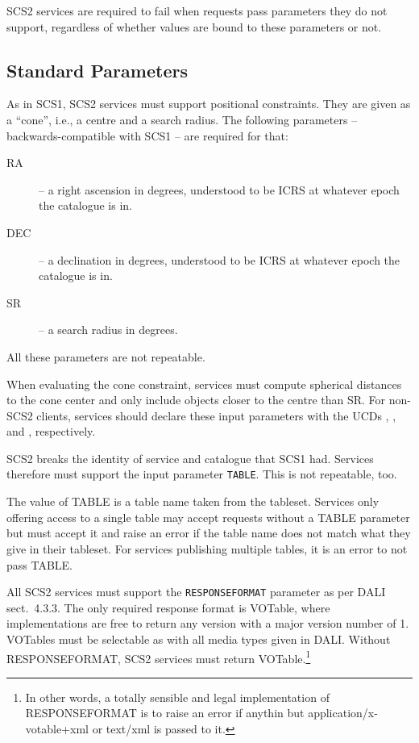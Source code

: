 \documentclass[11pt,a4paper]{ivoa}
\begin{document}
\begin{bigdescription}
SCS2 services are required to fail when requests pass parameters they do
not support, regardless of whether values are bound to these parameters
or not.

\subsection{Standard Parameters}

As in SCS1, SCS2 services must support positional constraints.  They are
given as a ``cone'', i.e., a centre and a search radius.  The following
parameters -- backwards-compatible with SCS1 -- are required for that:

\begin{description}
\item[RA] -- a right ascension in degrees, understood to be ICRS at
whatever epoch the catalogue is in.
\item[DEC] -- a declination in degrees, understood to be ICRS at
whatever epoch the catalogue is in.
\item[SR] -- a search radius in degrees.
\end{description}

All these parameters are not repeatable.

When evaluating the cone constraint, services must compute spherical
distances to the cone center and only include objects closer to the
centre than SR.  For non-SCS2 clients, services should declare these
input parameters with the UCDs , , and
, respectively.

SCS2 breaks the identity of service and catalogue that SCS1 had.
Services therefore must support the input parameter \verb|TABLE|.  This
is not repeatable, too.

The value of TABLE is a table name taken from the tableset.  Services
only offering access to a single table may accept requests without a
TABLE parameter but must accept it and raise an error if the table name
does not match what they give in their tableset.  For services
publishing multiple tables, it is an error to not pass TABLE.

All SCS2 services must support the \verb|RESPONSEFORMAT| parameter as
per DALI sect.~4.3.3.  The only required response format is VOTable,
where implementations are free to return any version with a major
version number of 1.  VOTables must be selectable as with all media
types given in DALI.  Without RESPONSEFORMAT, SCS2 services must return
VOTable.\footnote{In other words, a totally sensible and legal
implementation of RESPONSEFORMAT is to raise an error if anythin but
application/x-votable+xml or text/xml is passed to it.}


\end{bigdescription}
\end{document}
